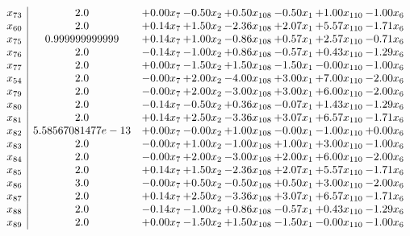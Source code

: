 \documentclass[8pt]{article}
\begin{document}
\[\begin{array}{c| c c@{\hskip 2pt} c@{\hskip 2pt} c@{\hskip 2pt} c@{\hskip 2pt} c@{\hskip 2pt} c@{\hskip 2pt} }
 x_{73}   &  2.0 & +  0.00 x_{7} & -0.50 x_{2} & +  0.50 x_{108} & -0.50 x_{1} & +  1.00 x_{110} & -1.00 x_{6}\\
 x_{60}   &  2.0 & +  0.14 x_{7} & +  1.50 x_{2} & -2.36 x_{108} & +  2.07 x_{1} & +  5.57 x_{110} & -1.71 x_{6}\\
 x_{75}   &  0.999999999999 & +  0.14 x_{7} & +  1.00 x_{2} & -0.86 x_{108} & +  0.57 x_{1} & +  2.57 x_{110} & -0.71 x_{6}\\
 x_{76}   &  2.0 & -0.14 x_{7} & -1.00 x_{2} & +  0.86 x_{108} & -0.57 x_{1} & +  0.43 x_{110} & -1.29 x_{6}\\
 x_{77}   &  2.0 & +  0.00 x_{7} & -1.50 x_{2} & +  1.50 x_{108} & -1.50 x_{1} & -0.00 x_{110} & -1.00 x_{6}\\
 x_{54}   &  2.0 & -0.00 x_{7} & +  2.00 x_{2} & -4.00 x_{108} & +  3.00 x_{1} & +  7.00 x_{110} & -2.00 x_{6}\\
 x_{79}   &  2.0 & -0.00 x_{7} & +  2.00 x_{2} & -3.00 x_{108} & +  3.00 x_{1} & +  6.00 x_{110} & -2.00 x_{6}\\
 x_{80}   &  2.0 & -0.14 x_{7} & -0.50 x_{2} & +  0.36 x_{108} & -0.07 x_{1} & +  1.43 x_{110} & -1.29 x_{6}\\
 x_{81}   &  2.0 & +  0.14 x_{7} & +  2.50 x_{2} & -3.36 x_{108} & +  3.07 x_{1} & +  6.57 x_{110} & -1.71 x_{6}\\
 x_{82}   &  5.58567081477e-13 & +  0.00 x_{7} & -0.00 x_{2} & +  1.00 x_{108} & -0.00 x_{1} & -1.00 x_{110} & +  0.00 x_{6}\\
 x_{83}   &  2.0 & -0.00 x_{7} & +  1.00 x_{2} & -1.00 x_{108} & +  1.00 x_{1} & +  3.00 x_{110} & -1.00 x_{6}\\
 x_{84}   &  2.0 & -0.00 x_{7} & +  2.00 x_{2} & -3.00 x_{108} & +  2.00 x_{1} & +  6.00 x_{110} & -2.00 x_{6}\\
 x_{85}   &  2.0 & +  0.14 x_{7} & +  1.50 x_{2} & -2.36 x_{108} & +  2.07 x_{1} & +  5.57 x_{110} & -1.71 x_{6}\\
 x_{86}   &  3.0 & -0.00 x_{7} & +  0.50 x_{2} & -0.50 x_{108} & +  0.50 x_{1} & +  3.00 x_{110} & -2.00 x_{6}\\
 x_{87}   &  2.0 & +  0.14 x_{7} & +  2.50 x_{2} & -3.36 x_{108} & +  3.07 x_{1} & +  6.57 x_{110} & -1.71 x_{6}\\
 x_{88}   &  2.0 & -0.14 x_{7} & -1.00 x_{2} & +  0.86 x_{108} & -0.57 x_{1} & +  0.43 x_{110} & -1.29 x_{6}\\
 x_{89}   &  2.0 & +  0.00 x_{7} & -1.50 x_{2} & +  1.50 x_{108} & -1.50 x_{1} & -0.00 x_{110} & -1.00 x_{6}\\

\end{array}\]
\end{document}
